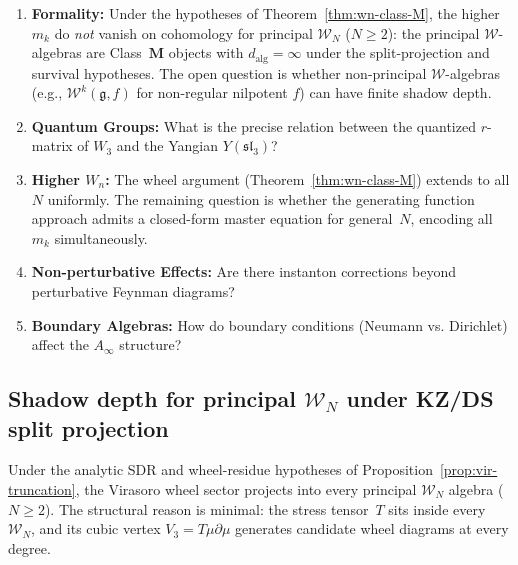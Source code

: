 \begin{enumerate}
\item \textbf{Formality:} Under the hypotheses of
 Theorem~\ref{thm:wn-class-M}, the higher $m_k$ do \emph{not}
 vanish on cohomology for principal $\mathcal{W}_N$ ($N \ge 2$):
 the principal $\mathcal{W}$-algebras are
 Class~$\mathbf{M}$ objects with $d_{\mathrm{alg}} = \infty$
 under the split-projection and survival hypotheses.
 The open question
 is whether non-principal $\mathcal{W}$-algebras
 (e.g., $\mathcal{W}^k(\mathfrak{g}, f)$ for non-regular
 nilpotent $f$) can have finite shadow depth.

\item \textbf{Quantum Groups:} What is the precise relation between the quantized $r$-matrix of $W_3$ and the Yangian $Y(\mathfrak{sl}_3)$?

\item \textbf{Higher $W_n$:} The wheel argument
 (Theorem~\ref{thm:wn-class-M}) extends to all $N$
 uniformly. The remaining question is whether the
 generating function approach admits a closed-form
 master equation for general~$N$, encoding all $m_k$
 simultaneously.

\item \textbf{Non-perturbative Effects:} Are there instanton corrections beyond perturbative Feynman diagrams?

\item \textbf{Boundary Algebras:} How do boundary conditions (Neumann vs. Dirichlet) affect the $A_\infty$ structure?
\end{enumerate}


\subsection{Shadow depth for principal
\texorpdfstring{$\mathcal{W}_N$}{W\_N} under KZ/DS split projection}
\label{subsec:wn-class-M}

Under the analytic SDR and wheel-residue hypotheses of
Proposition~\ref{prop:vir-truncation}, the Virasoro wheel sector
projects into every principal $\mathcal{W}_N$ algebra ($N \ge 2$).
The structural reason is minimal: the stress tensor~$T$ sits inside
every $\mathcal{W}_N$, and its cubic vertex
$V_3 = T\mu\partial\mu$ generates candidate wheel diagrams at every
degree.

